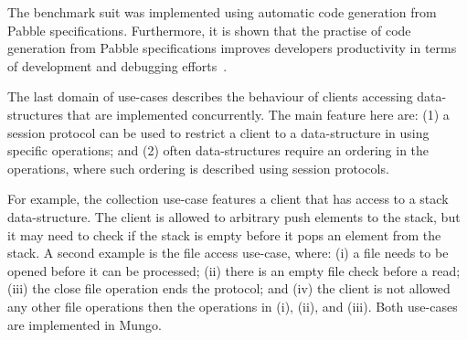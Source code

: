 The benchmark suit was implemented using automatic code generation
from Pabble specifications. Furthermore, it is shown that the practise
of code generation from Pabble specifications improves developers
productivity in terms of development and debugging efforts~\cite{NCY2015}.

The last domain of use-cases describes the behaviour of
clients accessing data-structures that are implemented
concurrently. The main feature here are:
(1) a session protocol can be used to restrict
a client to a data-structure in using specific operations; and
(2) often data-structures require an ordering in the
operations, where such ordering is described using session protocols.

For example, the collection use-case features a client
that has access to a stack data-structure. The client
is allowed to arbitrary push elements to the stack, but
it may need to check if the stack is empty before it
pops an element from the stack.
A second example is the file access use-case, where:
(i) a file needs to be opened before it can be processed;
(ii) there is an empty file check before a read;
(iii) the close file operation ends the protocol; and
(iv) the client is not allowed any other file operations then
the operations in (i), (ii), and (iii).
Both use-cases are implemented in Mungo.

